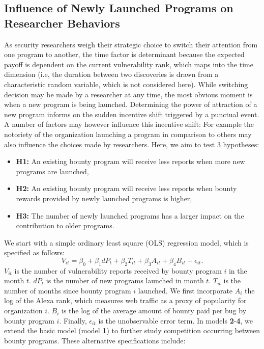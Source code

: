 \subsection{Influence of Newly Launched Programs on Researcher Behaviors}
\label{ols}
As security researchers weigh their strategic choice to switch their attention from one program to another, the time factor is determinant because the expected payoff is dependent on the current vulnerability rank, which maps into the time dimension (i.e, the duration between two discoveries is drawn from a characteristic random variable, which is not considered here). While switching decision may be made by a researcher at any time, the most obvious moment is when a new program is being launched. Determining the power of attraction of a new program informs on the sudden incentive shift triggered by a punctual event. A number of factors may however influence this incentive shift: For example the notoriety of the organization launching a program in comparison to others may also influence the choices made by researchers. Here, we aim to test  3 hypotheses:

\begin{itemize}
  \item {\bf H1:} An existing bounty program will receive less reports when more new programs are launched,
  \item {\bf H2:} An existing bounty program will receive less reports when bounty rewards provided by newly launched programs is higher,
  \item {\bf H3:} The number of newly launched programs has a larger impact on the contribution to older programs.
\end{itemize}


We start with a simple ordinary least square (OLS) regression model, which is specified as follows:
\begin{equation}
\label{reg_base}
V_{it} = \beta_0 + \beta_1 dP_t + \beta_2 T_{it} + \beta_3 A_{it} + \beta_4 B_{it} + \epsilon_{it}.
\end{equation}
$V_{it}$ is the number of vulnerability reports received by bounty program $i$ in the month $t$. $dP_t$ is the number of new programs launched in month $t$. $T_{it}$ is the number of months since bounty program $i$ launched. We first incorporate $A_i$ the log of the Alexa rank, which measures web traffic  as a proxy of popularity for organization $i$. $B_i$ is the log of the average amount of bounty paid per bug by bounty program $i$. Finally, $\epsilon_{it}$ is the unobservable error term. In models {\bf 2}-{\bf 4}, we extend the basic model (model {\bf 1}) to further study competition occurring between bounty programs. These alternative specifications include:

